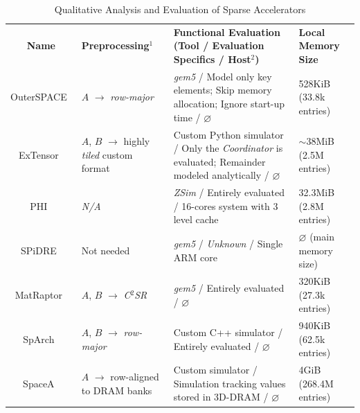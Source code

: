 \begin{table}
    \centering
    \caption{Qualitative Analysis and Evaluation of Sparse Accelerators}
    \footnotesize
    \begin{tabular}{|c|| >{\centering\arraybackslash}m{1.97cm}| >{\centering\arraybackslash}m{7.17cm}| >{\centering\arraybackslash}m{2.7cm}|}
        \hhline{-||---}
        \textbf{Name} & \textbf{Preprocessing\hyperlink{fn101}{$^{1}$}} & \textbf{Functional Evaluation (Tool / Evaluation Specifics / Host\hyperlink{fn102}{$^{2}$})} & \textbf{Local Memory Size} \\
        \hhline{=::===}
        OuterSPACE~\cite{Pal2018_OuterSPACE} & $A$ $\rightarrow$ \emph{row-major} & \emph{gem5} / Model only key elements; Skip memory allocation; Ignore start-up time / $\varnothing$ & 528KiB (33.8k entries) \\ %
        \hhline{-||---}
        ExTensor~\cite{Hegde2019_ExTensor} & $A$, $B$ $\rightarrow$ highly \emph{tiled} custom format & Custom Python simulator / Only the \emph{Coordinator} is evaluated; Remainder modeled analytically / $\varnothing$ & $\sim$38MiB (2.5M entries) \\ %
        \hhline{-||---}
        PHI~\cite{Mukkara2019_PHI} & \emph{N/A} & \emph{ZSim} / Entirely evaluated / 16-cores system with 3 level cache & 32.3MiB (2.8M entries) \\ %
        \hhline{-||---}
        SPiDRE~\cite{Barredo2019_SPiDRE} & Not needed & \emph{gem5} / \emph{Unknown} / Single ARM core & $\varnothing$ (main memory size) \\ %
        \hhline{-||---}
        MatRaptor~\cite{Srivastava2020_MatRaptor} & $A$, $B$ $\rightarrow$ \emph{C$^2$SR} & \emph{gem5} / Entirely evaluated / $\varnothing$ & 320KiB (27.3k entries) \\ %
        \hhline{-||---}
        SpArch~\cite{Zhekai2020_SpArch} & $A$, $B$ $\rightarrow$ \emph{row-major} & Custom C++ simulator / Entirely evaluated / $\varnothing$ & 940KiB (62.5k entries) \\ %
        \hhline{-||---}
        SpaceA~\cite{Xie2021_SpaceA} & $A$ $\rightarrow$ row-aligned to DRAM banks & Custom simulator / Simulation tracking values stored in 3D-DRAM / $\varnothing$ & 4GiB (268.4M entries) \\ %

\end{tabular}
\end{table}
